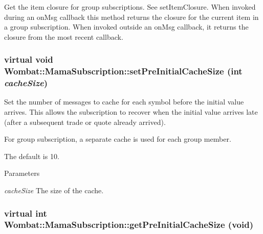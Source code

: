 Get the item closure for group subscriptions. See setItemClosure. When invoked during an onMsg callback this method returns the closure for the current item in a group subscription. When invoked outside an onMsg callback, it returns the closure from the most recent callback. \hypertarget{classWombat_1_1MamaSubscription_ab377b043417b8e6544d677b4ad141b77}{
\subsubsection[{setPreInitialCacheSize}]{\setlength{\rightskip}{0pt plus 5cm}virtual void Wombat::MamaSubscription::setPreInitialCacheSize (int {\em cacheSize})}}
\label{classWombat_1_1MamaSubscription_ab377b043417b8e6544d677b4ad141b77}


Set the number of messages to cache for each symbol before the initial value arrives. This allows the subscription to recover when the initial value arrives late (after a subsequent trade or quote already arrived).

For group subscription, a separate cache is used for each group member.

The default is 10.


\begin{DoxyParams}{Parameters}
\item[{\em cacheSize}]The size of the cache. \end{DoxyParams}
\hypertarget{classWombat_1_1MamaSubscription_af9cffd081567024fc88e97c1011e0dc7}{
\subsubsection[{getPreInitialCacheSize}]{\setlength{\rightskip}{0pt plus 5cm}virtual int Wombat::MamaSubscription::getPreInitialCacheSize (void)}}
\label{classWombat_1_1MamaSubscription_af9cffd081567024fc88e97c1011e0dc7}


